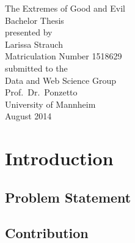 \documentclass[11pt,titlepage,oneside,openany]{book}
\begin{document}
\begin{titlepage}
	\vspace*{2cm}
  \begin{center}
   {\Large The Extremes of Good and Evil\\}
   \vspace{2cm} 
   {Bachelor Thesis\\}
   \vspace{2cm}
   {presented by\\
    Larissa Strauch \\
    Matriculation Number 1518629\\
   }
   \vspace{1cm} 
   {submitted to the\\
    Data and Web Science Group\\
    Prof.\ Dr.\ Ponzetto\\
    University of Mannheim\\} \vspace{2cm}
   {August 2014}
  \end{center}
\end{titlepage} 

\tableofcontents
\newpage

\listofalgorithms

\listoffigures

\listoftables


\newpage



\chapter{Introduction}

\section{Problem Statement}
 
 

\section{Contribution}

 
\end{document}
